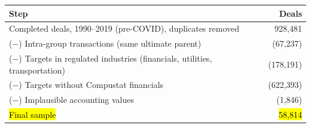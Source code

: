 \documentclass[border=6pt]{standalone}
\begin{document}
\begin{tabular}{lr}
\toprule
\textbf{Step} & \textbf{Deals} \\
\midrule
Completed deals, 1990--2019 (pre-COVID), duplicates removed & 928,481 \\
($-$) Intra-group transactions (same ultimate parent) & (67,237) \\
($-$) Targets in regulated industries (financials, utilities, transportation) & (178,191) \\
($-$) Targets without Compustat financials & (622,393) \\
($-$) Implausible accounting values & (1,846) \\
\midrule
\hl{Final sample} & \hl{58,814} \\
\bottomrule
\end{tabular}
\end{document}
